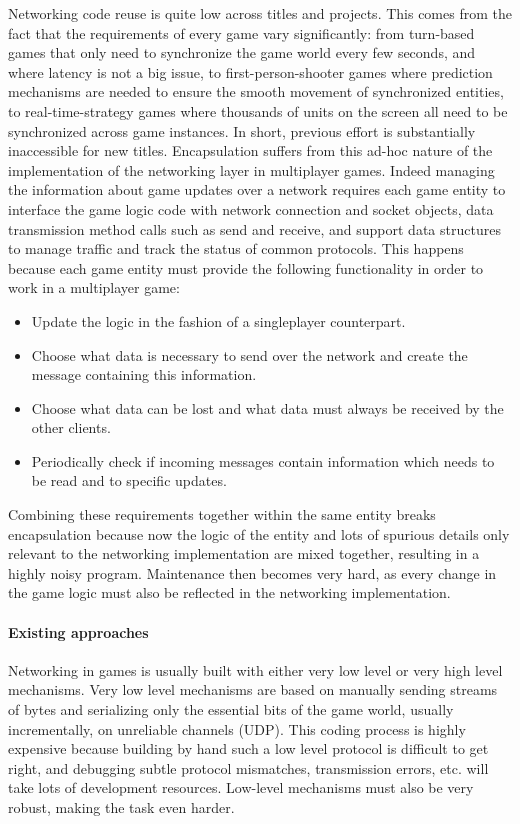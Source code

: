 Networking code reuse is quite low across titles and projects. This comes from the fact that the requirements of every game vary significantly: from turn-based games that only need to synchronize the game world every few seconds, and where latency is not a big issue, to first-person-shooter games where prediction mechanisms are needed to ensure the smooth movement of synchronized entities, to real-time-strategy games where thousands of units on the screen all need to be synchronized across game instances. In short, previous effort is substantially inaccessible for new titles. Encapsulation suffers from this ad-hoc nature of the implementation of the networking layer in multiplayer games. Indeed managing the information about game updates over a network requires each game entity to interface the game logic code with network connection and socket objects, data transmission method calls such as send and receive, and support data structures to manage traffic and track the status of common protocols. This happens because each game entity must provide the following functionality in order to work in a multiplayer game:

\begin{itemize}
	\item Update the logic in the fashion of a singleplayer counterpart.
	\item Choose what data is necessary to send over the network and create the message containing this information.
	\item Choose what data can be lost and what data must always be received by the other clients.
	\item Periodically check if incoming messages contain information which needs to be read and to specific updates.
\end{itemize}

Combining these requirements together within the same entity breaks encapsulation because now the logic of the entity and lots of spurious details only relevant to the networking implementation are mixed together, resulting in a highly noisy program. Maintenance then becomes very hard, as every change in the game logic must also be reflected in the networking implementation.

\paragraph*{Existing approaches}
Networking in games is usually built with either very low level or very high level mechanisms. Very low level mechanisms are based on manually sending streams of bytes and serializing only the essential bits of the game world, usually incrementally, on unreliable channels (UDP). This coding process is highly expensive because building by hand such a low level protocol is difficult to get right, and debugging subtle protocol mismatches, transmission errors, etc. will take lots of development resources. Low-level mechanisms must also be very robust, making the task even harder.

